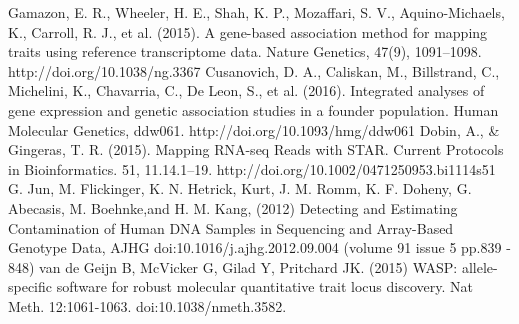 \documentclass[a4paper, 11pt]{article}
\begin{document}
\begin{thebibliography}{9}
 Gamazon, E. R., Wheeler, H. E., Shah, K. P., Mozaffari, S. V., Aquino-Michaels, K., Carroll, R. J., et al. (2015). A gene-based association method for mapping traits using reference transcriptome data. Nature Genetics, 47(9), 1091–1098. http://doi.org/10.1038/ng.3367
 Cusanovich, D. A., Caliskan, M., Billstrand, C., Michelini, K., Chavarria, C., De Leon, S., et al. (2016). Integrated analyses of gene expression and genetic association studies in a founder population. Human Molecular Genetics, ddw061. http://doi.org/10.1093/hmg/ddw061
 Dobin, A., \& Gingeras, T. R. (2015). Mapping RNA-seq Reads with STAR. Current Protocols in Bioinformatics. 51, 11.14.1–19. http://doi.org/10.1002/0471250953.bi1114s51
 G. Jun, M. Flickinger, K. N. Hetrick, Kurt, J. M. Romm, K. F. Doheny, G. Abecasis, M. Boehnke,and H. M. Kang, (2012) Detecting and Estimating Contamination of Human DNA Samples in Sequencing and Array-Based Genotype Data, AJHG doi:10.1016/j.ajhg.2012.09.004 (volume 91 issue 5 pp.839 - 848)
van de Geijn B, McVicker G, Gilad Y, Pritchard JK. (2015) WASP: allele-specific software for robust molecular quantitative trait locus discovery. Nat Meth. 12:1061-1063. doi:10.1038/nmeth.3582.
\end{thebibliography}
\end{document}
